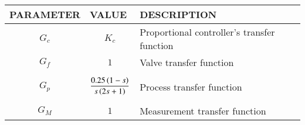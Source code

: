 \begin{tabular}{|p{2cm}|p{2cm}|p{3.8cm}|}
    \hline
    PARAMETER & VALUE  & DESCRIPTION \\ \hline
    $$G_c$$ & $$K_c$$ & Proportional controller's transfer function \\ \hline
    $$G_f$$ & $$1$$ & Valve transfer function \\ \hline
    $$G_p$$ & $$\frac{0.25\left(1-s\right)}{s\left(2s+1\right)}$$ & Process transfer function   \\ \hline
    $$G_M$$ & $$1$$ & Measurement transfer function \\ \hline 
    \end{tabular}
